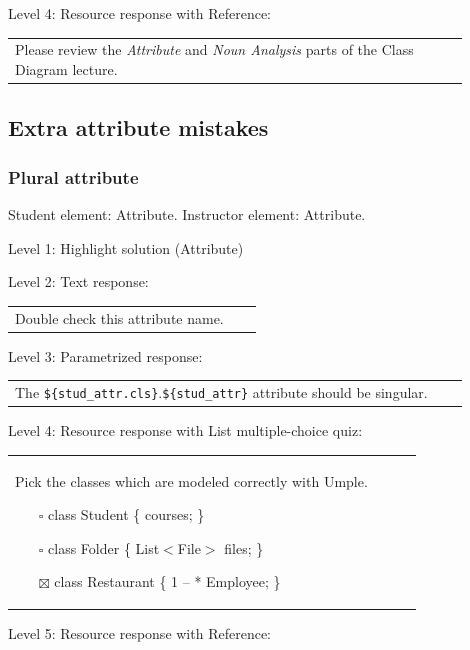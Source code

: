 \noindent Level 4: Resource response with Reference: \medskip

\begin{tabular}{|p{0.9\linewidth}}
Please review the \textit{Attribute} and \textit{Noun Analysis} parts of the Class Diagram lecture.
\end{tabular} \medskip


\subsection{Extra attribute mistakes}

\subsubsection{Plural attribute}

Student element: Attribute. Instructor element: Attribute. \medskip

\noindent Level 1: Highlight solution (Attribute) \medskip

\noindent Level 2: Text response: \medskip

\begin{tabular}{|p{0.9\linewidth}}
Double check this attribute name.
\end{tabular} \medskip

\noindent Level 3: Parametrized response: \medskip

\begin{tabular}{|p{0.9\linewidth}}
The \verb|${stud_attr.cls}|.\verb|${stud_attr}| attribute should be singular.
\end{tabular} \medskip

\noindent Level 4: Resource response with List multiple-choice quiz: \medskip

\begin{tabular}{|p{0.9\linewidth}}

Pick the classes which are modeled correctly with Umple.

\begin{itemize}
    \item[$\square$] class Student \{ courses; \}
    \item[$\square$] class Folder \{ List$<$File$>$ files; \}
    \item[$\boxtimes$] class Restaurant \{ 1 -- * Employee; \}
\end{itemize}

\end{tabular} \medskip

\noindent Level 5: Resource response with Reference: \medskip

